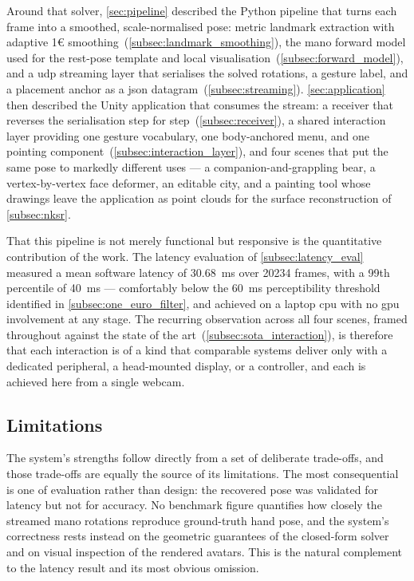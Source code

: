 Around that solver, \autoref{sec:pipeline} described the Python pipeline that turns
each frame into a smoothed, scale-normalised pose: metric landmark extraction with
adaptive 1\euro{} smoothing~(\autoref{subsec:landmark_smoothing}), the \acrshort{mano}
forward model used for the rest-pose template and local
visualisation~(\autoref{subsec:forward_model}), and a \acrshort{udp} streaming layer
that serialises the solved rotations, a gesture label, and a placement anchor as a
\acrshort{json} datagram~(\autoref{subsec:streaming}). \autoref{sec:application} then
described the Unity application that consumes the stream: a receiver that reverses the
serialisation step for step~(\autoref{subsec:receiver}), a shared interaction layer
providing one gesture vocabulary, one body-anchored menu, and one pointing
component~(\autoref{subsec:interaction_layer}), and four scenes that put the same pose
to markedly different uses --- a companion-and-grappling bear, a vertex-by-vertex face
deformer, an editable city, and a painting tool whose drawings leave the application
as point clouds for the surface reconstruction of \autoref{subsec:nksr}.

That this pipeline is not merely functional but responsive is the quantitative
contribution of the work. The latency evaluation of \autoref{subsec:latency_eval}
measured a mean software latency of \SI{30.68}{\ms} over \num{20234}
frames, with a 99th percentile of \SI{40}{\ms} --- comfortably below the \SI{60}{\ms}
perceptibility threshold identified in \autoref{subsec:one_euro_filter}, and achieved
on a laptop \acrshort{cpu} with no \acrshort{gpu} involvement at any stage. The
recurring observation across all four scenes, framed throughout against the state of
the art~(\autoref{subsec:sota_interaction}), is therefore that each interaction is of
a kind that comparable systems deliver only with a dedicated peripheral, a
head-mounted display, or a controller, and each is achieved here from a single webcam.

\subsection{Limitations}\label{subsec:conclusion_limitations}

The system's strengths follow directly from a set of deliberate trade-offs, and those
trade-offs are equally the source of its limitations. The most consequential is one of
evaluation rather than design: the recovered pose was validated for latency but not
for accuracy. No benchmark figure quantifies how closely the streamed \acrshort{mano}
rotations reproduce ground-truth hand pose, and the system's correctness rests instead
on the geometric guarantees of the closed-form solver and on visual inspection of the
rendered avatars. This is the natural complement to the latency result and its most
obvious omission.

